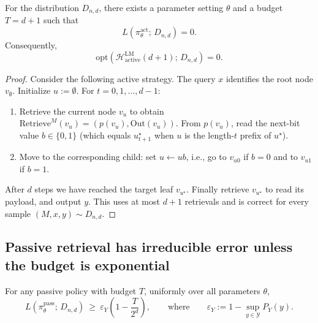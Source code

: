\documentclass{llmxive}
\begin{document}
\begin{lemma} \label{lem:active}
For the distribution \(D_{n,d}\), there exists a parameter setting \(\theta\) and a budget \(T=d+1\) such that
\[
L\!\left(\pi^{\mathrm{act}}_\theta;\, D_{n,d}\right)=0.
\]
Consequently,
\[
\mathrm{opt}\!\left(\mathcal{H}^{\mathrm{LM}}_{\mathrm{active}}(d+1);\, D_{n,d}\right)=0.
\]
\end{lemma}

\begin{proof}
Consider the following active strategy. The query \(x\) identifies the root node \(v_\emptyset\).
Initialize \(u:=\emptyset\). For \(t=0,1,\dots,d-1\):
\begin{enumerate}
\item Retrieve the current node \(v_u\) to obtain \(\mathrm{Retrieve}^M(v_u)=(p(v_u),\mathrm{Out}(v_u))\).
From \(p(v_u)\), read the next-bit value \(b\in\{0,1\}\) (which equals \(u^\star_{t+1}\) when \(u\) is the length-\(t\)
prefix of \(u^\star\)).
\item Move to the corresponding child: set \(u \leftarrow u b\), i.e., go to \(v_{u0}\) if \(b=0\) and to \(v_{u1}\) if
\(b=1\).
\end{enumerate}
After \(d\) steps we have reached the target leaf \(v_{u^\star}\). Finally retrieve \(v_{u^\star}\)  to read its payload, and output \(y\). This uses at most \(d+1\) retrievals and is
correct for every sample \((M,x,y)\sim D_{n,d}\).
\end{proof}


\subsection{Passive retrieval has irreducible error unless the budget is exponential}

\begin{lemma} \label{lem:passive}
For any passive policy with budget \(T\), uniformly over all parameters \(\theta\),
\[
L\!\left(\pi^{\mathrm{pass}}_\theta;\, D_{n,d}\right)\ \ge\ \varepsilon_Y\!\left(1-\frac{T}{2^d}\right),
\qquad\text{where}\qquad
\varepsilon_Y := 1 - \sup_{y\in\mathcal{Y}} P_Y(y).
\]
\end{lemma}
\end{document}
